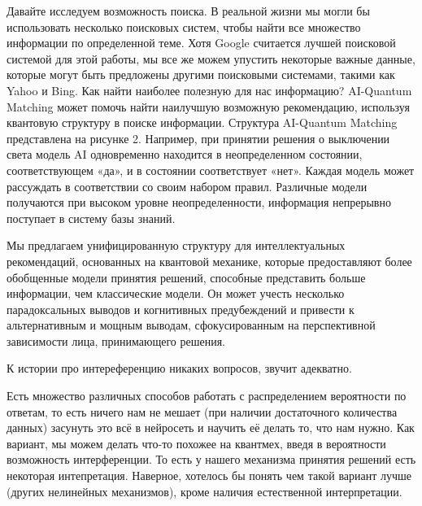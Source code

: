 Давайте исследуем возможность поиска. В реальной жизни мы могли бы использовать несколько поисковых систем, чтобы найти все множество информации по определенной теме. Хотя Google считается лучшей поисковой системой для этой работы, мы все же можем упустить некоторые важные данные, которые могут быть предложены другими поисковыми системами, такими как Yahoo и Bing. Как найти наиболее полезную для нас информацию? AI-Quantum Matching может помочь найти наилучшую возможную рекомендацию, используя квантовую структуру в поиске информации. Структура AI-Quantum Matching представлена ​​на рисунке 2. Например, при принятии решения о выключении света модель AI одновременно находится в неопределенном состоянии, соответствующем «да», и в состоянии соответствует «нет». Каждая модель может рассуждать в соответствии со своим набором правил. Различные модели получаются при высоком уровне неопределенности, информация непрерывно поступает в систему базы знаний.


Мы предлагаем унифицированную структуру для интеллектуальных рекомендаций, основанных на квантовой механике, которые предоставляют более обобщенные модели принятия решений, способные представить больше информации, чем классические модели. Он может учесть несколько парадоксальных выводов и когнитивных предубеждений и привести к альтернативным и мощным выводам, сфокусированным на перспективной зависимости лица, принимающего решения.


К истории про интереференцию никаких вопросов, звучит адекватно. 

Есть множество различных способов работать с распределением вероятности по ответам, то есть ничего нам не мешает (при наличии достаточного количества данных) засунуть это всё в нейросеть и научить её делать то, что нам нужно. Как вариант, мы можем делать что-то похожее на квантмех, введя в вероятности возможность интерференции. То есть у нашего механизма принятия решений есть некоторая интепретация. Наверное, хотелось бы понять чем такой вариант лучше (других нелинейных механизмов), кроме наличия естественной интерпретации.



